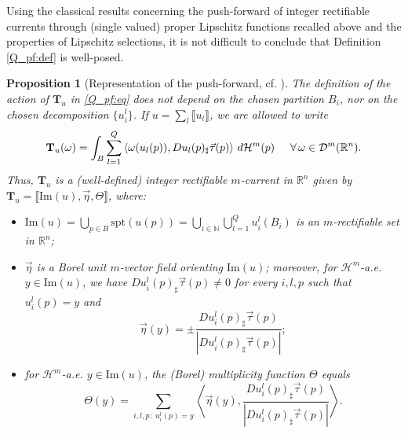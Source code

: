 \documentclass[a4paper,11pt,reqno]{amsart}
\newtheorem{proposition}[theorem]{Proposition}
\theoremstyle{definition}
\numberwithin{equation}{section}
\numberwithin{subsection}{section}
\newcommand{\R}{\mathbb{R}}
\newcommand{\spt}{\mathrm{spt}}
\newcommand{\Ha}{\mathcal{H}}
\begin{document}
Using the classical results concerning the push-forward of integer rectifiable currents through (single valued) proper Lipschitz functions recalled above and the properties of Lipschitz selections, it is not difficult to conclude that Definition \ref{Q_pf:def} is well-posed.
\begin{proposition}[Representation of the push-forward, cf. {\cite[Proposition 1.4]{DLS13a}}] \label{Q_pf:repr}
The definition of the action of $\mathbf{T}_{u}$ in \eqref{Q_pf:eq} does not depend on the chosen partition $B_i$, nor on the chosen decomposition $\{u_{i}^{l}\}$. If $u = \sum_{l} \llbracket u_{l} \rrbracket$, we are allowed to write
\begin{equation}
\mathbf{T}_{u}(\omega) = \int_{B} \sum_{l=1}^{Q} \left\langle \omega(u_{l}(p)), Du_{l}(p)_{\sharp}\vec{\tau}(p) \right\rangle \, d\Ha^{m}(p) \hspace{0.5cm} \forall \, \omega \in \mathcal{D}^{m}(\R^n).
\end{equation}
Thus, $\mathbf{T}_{u}$ is a (well-defined) integer rectifiable $m$-current in $\R^n$ given by $\mathbf{T}_{u} = \llbracket \mathrm{Im}(u),  \vec{\eta}, \Theta \rrbracket$, where:
\begin{itemize}
\item[$(R1)$] $\mathrm{Im}(u) = \bigcup_{p \in B} \spt(u(p)) = \bigcup_{i \in \mathbb{N}} \bigcup_{l=1}^{Q} u_{i}^{l}(B_i)$ is an $m$-rectifiable set in $\R^n$;
\item[$(R2)$] $\vec{\eta}$ is a Borel unit $m$-vector field orienting $\mathrm{Im}(u)$; moreover, for $\Ha^m$-a.e. $y \in \mathrm{Im}(u)$, we have $Du_{i}^{l}(p)_{\sharp}\vec{\tau}(p) \neq 0$ for every $i,l,p$ such that $u_{i}^{l}(p) = y$ and
\begin{equation}
\vec{\eta}(y) = \pm \frac{Du_{i}^{l}(p)_{\sharp}\vec{\tau}(p)}{|Du_{i}^{l}(p)_{\sharp}\vec{\tau}(p)|};
\end{equation}
\item[$(R3)$] for $\Ha^m$-a.e. $y \in \mathrm{Im}(u)$, the (Borel) multiplicity function $\Theta$ equals
\begin{equation}
\Theta(y) = \sum_{i,l,p \, \colon \, u_{i}^{l}(p) = y} \left\langle \vec{\eta}(y), \frac{Du_{i}^{l}(p)_{\sharp}\vec{\tau}(p)}{|Du_{i}^{l}(p)_{\sharp}\vec{\tau}(p)|}\right\rangle.
\end{equation}
\end{itemize}
\end{proposition}
\end{document}
